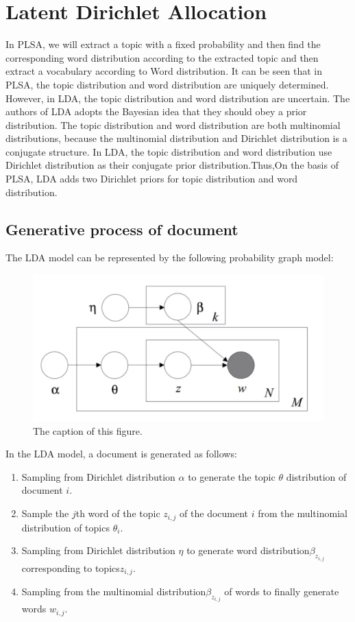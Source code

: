 \section{Latent Dirichlet Allocation}
In PLSA, we will extract a topic with a fixed probability and then find the corresponding word distribution according to the extracted topic and then extract a vocabulary according to Word distribution.
It can be seen that in PLSA, the topic distribution and word distribution are uniquely determined. However, in LDA, the topic distribution and word distribution are uncertain. The authors of LDA adopts the Bayesian idea that they should obey a prior distribution. The topic distribution and word distribution are both multinomial distributions, because the multinomial distribution and Dirichlet distribution is a conjugate structure. In LDA, the topic distribution and word distribution use Dirichlet distribution as their conjugate prior distribution.Thus,On the basis of PLSA, LDA adds two Dirichlet priors for topic distribution and word distribution.
\subsection{Generative process of document}
The LDA model can be represented by the following probability graph model:
\begin{figure}[htbp]
\includegraphics[width = \linewidth]{lda.png}
\caption{The caption of this figure.}
\label{fig:figure1label}
\end{figure}


In the LDA model, a document is generated as follows:
\begin{enumerate}
  \item Sampling from Dirichlet distribution $\alpha$ to generate the topic $\theta$ distribution of document $i$.

  \item Sample the $j$th word of the topic $z_{i,j}$  of the document $i$ from the multinomial distribution of topics $\theta_i$.

  \item Sampling from Dirichlet distribution $\eta$ to generate word distribution$\beta_{z_{i,j}}$ corresponding to topics$z_{i,j}$.

  \item Sampling from the multinomial distribution$\beta_{z_{i,j}}$  of words to finally generate words $w_{i,j}$.

\end{enumerate}

